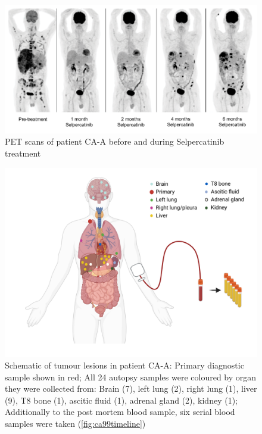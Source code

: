 \begin{figure}[ht]
\centering
\includegraphics[width=.99\linewidth]{Figures/CASCADE/CA99/CA-A_PETscans}
\caption[PET scans of patient CA-A before and during Selpercatinib treatment]{PET scans of patient CA-A before and during Selpercatinib treatment} \label{fig:ca99pet}
\end{figure}


\begin{figure}[ht]
\centering
\includegraphics[width=.99\linewidth]{Figures/CASCADE/CA99/CA-A_schematic_CA99_organColours}
\caption[Schematic of tumour lesions in patient CA-A]{Schematic of tumour lesions in patient CA-A: Primary diagnostic sample shown in red; All 24 autopsy samples were coloured by organ they were collected from: Brain (7), left lung (2), right lung (1), liver (9), T8 bone (1), ascitic fluid (1), adrenal gland (2), kidney (1); Additionally to the post mortem blood sample, six serial blood samples were taken (\protect\autoref{fig:ca99timeline})} \label{fig:ca99schematic}
\end{figure}


